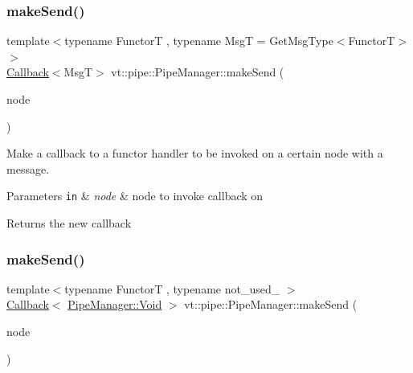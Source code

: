 \subsubsection{\texorpdfstring{make\+Send()}{makeSend()}\hspace{0.1cm}{\footnotesize\ttfamily [2/6]}}
{\footnotesize\ttfamily template$<$typename FunctorT , typename MsgT  = Get\+Msg\+Type$<$\+Functor\+T$>$$>$ \\
\hyperlink{namespacevt_a36db99df4c973d48b1118a293fff533f}{Callback}$<$MsgT$>$ vt\+::pipe\+::\+Pipe\+Manager\+::make\+Send (\begin{DoxyParamCaption}\item[{\hyperlink{namespacevt_a866da9d0efc19c0a1ce79e9e492f47e2}{Node\+Type} const \&}]{node }\end{DoxyParamCaption})}



Make a callback to a functor handler to be invoked on a certain node with a message. 


\begin{DoxyParams}[1]{Parameters}
\mbox{\tt in}  & {\em node} & node to invoke callback on\\
\hline
\end{DoxyParams}
\begin{DoxyReturn}{Returns}
the new callback 
\end{DoxyReturn}
\mbox{\label{structvt_1_1pipe_1_1_pipe_manager_a89f95b27b13c69f2fe84dc29fd604082}} 
\subsubsection{\texorpdfstring{make\+Send()}{makeSend()}\hspace{0.1cm}{\footnotesize\ttfamily [3/6]}}
{\footnotesize\ttfamily template$<$typename FunctorT , typename not\+\_\+used\+\_\+ $>$ \\
\hyperlink{namespacevt_a36db99df4c973d48b1118a293fff533f}{Callback}$<$ \hyperlink{structvt_1_1pipe_1_1_pipe_manager_ab720c2580ecfd3ab36e49aeaaff64cc6}{Pipe\+Manager\+::\+Void} $>$ vt\+::pipe\+::\+Pipe\+Manager\+::make\+Send (\begin{DoxyParamCaption}\item[{\hyperlink{namespacevt_a866da9d0efc19c0a1ce79e9e492f47e2}{Node\+Type} const \&}]{node }\end{DoxyParamCaption})}



